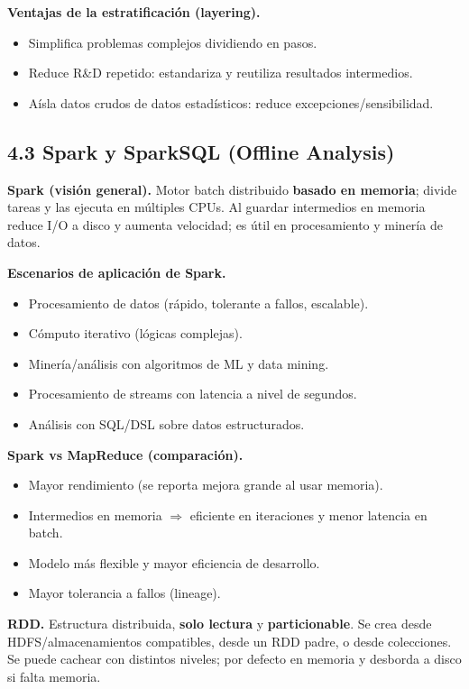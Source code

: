 \documentclass[8pt,a4paper,twocolumn]{article}
\begin{document}
\textbf{Ventajas de la estratificación (layering).}
\begin{itemize}
\item Simplifica problemas complejos dividiendo en pasos.
\item Reduce R\&D repetido: estandariza y reutiliza resultados intermedios.
\item Aísla datos crudos de datos estadísticos: reduce excepciones/sensibilidad.
\end{itemize}

\subsection{4.3 Spark y SparkSQL (Offline Analysis)}
\textbf{Spark (visión general).} Motor batch distribuido \textbf{basado en memoria}; divide tareas y las ejecuta en múltiples CPUs. Al guardar intermedios en memoria reduce I/O a disco y aumenta velocidad; es útil en procesamiento y minería de datos.

\textbf{Escenarios de aplicación de Spark.}
\begin{itemize}
\item Procesamiento de datos (rápido, tolerante a fallos, escalable).
\item Cómputo iterativo (lógicas complejas).
\item Minería/análisis con algoritmos de ML y data mining.
\item Procesamiento de streams con latencia a nivel de segundos.
\item Análisis con SQL/DSL sobre datos estructurados.
\end{itemize}

\textbf{Spark vs MapReduce (comparación).}
\begin{itemize}
\item Mayor rendimiento (se reporta mejora grande al usar memoria).
\item Intermedios en memoria $\Rightarrow$ eficiente en iteraciones y menor latencia en batch.
\item Modelo más flexible y mayor eficiencia de desarrollo.
\item Mayor tolerancia a fallos (lineage).
\end{itemize}

\textbf{RDD.} Estructura distribuida, \textbf{solo lectura} y \textbf{particionable}. Se crea desde HDFS/almacenamientos compatibles, desde un RDD padre, o desde colecciones. Se puede cachear con distintos niveles; por defecto en memoria y desborda a disco si falta memoria.
\end{document}
